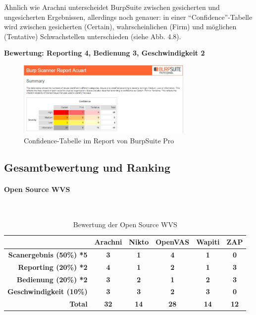 \documentclass[12pt,oneside,a4paper,parskip,pointlessnumbers]{scrbook}
\begin{document}
\begin{itemize}
          Ähnlich wie Arachni unterscheidet BurpSuite zwischen gesicherten und ungesicherten Ergebnissen, allerdings noch genauer: in einer ``Confidence''-Tabelle wird zwischen gesicherten (Certain), wahrscheinlichen (Firm) und möglichen (Tentative) Schwachstellen unterschieden (siehe Abb. 4.8).

          \textbf{Bewertung: Reporting 4, Bedienung 3, Geschwindigkeit 2}
          \begin{figure}[htb!]
            \centering
            \includegraphics[width=0.76\textwidth]{Images/BurpReport}
            \caption[Confidence-Tabelle im Report von BurpSuite Pro]{Confidence-Tabelle im Report von BurpSuite Pro}
          \end{figure}
     \end{itemize}
     \subsection{Gesamtbewertung und Ranking}
     \paragraph{Open Source WVS}
     \
       \begin{table}[H]
       \begin{tabular}{|r|c|c|c|c|c|}
       \hline
       \textbf{}            & \textbf{Arachni} & \textbf{Nikto} & \textbf{OpenVAS} & \textbf{Wapiti} & \textbf{ZAP}  \\
       \hline
       \textbf{Scanergebnis (50\%) *5}    & \textbf{3}      &  \textbf{1}      & \textbf{4}      &   \textbf{1}     &  \textbf{0}       \\
       \hline
       \textbf{Reporting (20\%) *2}       &  \textbf{4}     &  \textbf{1}      & \textbf{2}      &   \textbf{1}    &   \textbf{3}     \\
       \hline
       \textbf{Bedienung (20\%) *2}       & \textbf{3}       & \textbf{2}     & \textbf{1}       & \textbf{2}      & \textbf{3}        \\
       \hline
       \textbf{Geschwindigkeit (10\%)} & \textbf{3}       & \textbf{3}    & \textbf{2}       & \textbf{3}     & \textbf{0}          \\
       \hline
       \textbf{Total}                 &   \textbf{32}     &  \textbf{14}   &  \textbf{28}      &  \textbf{14}    &  \textbf{12}          \\
       \hline
       \end{tabular}
       \caption[Bewertung der Open Source WVS]{Bewertung der Open Source WVS}
     \end{table}
\end{document}
